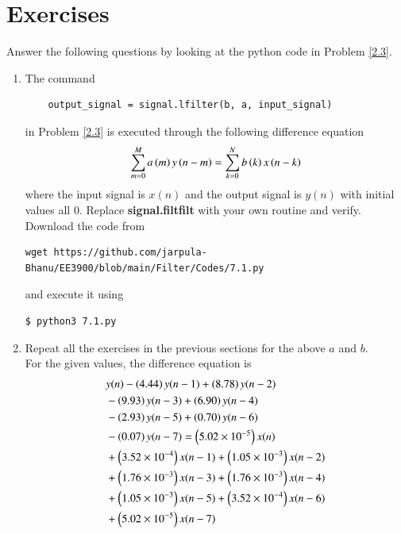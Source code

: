 \documentclass[journal,12pt,twocolumn]{IEEEtran}
\renewcommand\thesection{\arabic{section}}
\begin{document}
\section{Exercises}
Answer the following questions by looking at the python code in Problem \ref{2.3}.
\begin{enumerate}[label=\thesection.\arabic*]
\item
The command
\begin{lstlisting}
	output_signal = signal.lfilter(b, a, input_signal)
	\end{lstlisting}
in Problem \ref{2.3} is executed through the following difference equation
\begin{equation}
\label{eq:iir_filter_gen}
 \sum _{m=0}^{M}a\left(m\right)y\left(n-m\right)=\sum _{k=0}^{N}b\left(k\right)x\left(n-k\right)
\end{equation}
%
where the input signal is $x(n)$ and the output signal is $y(n)$ with initial values all 0. Replace
\textbf{signal.filtfilt} with your own routine and verify.\\
\solution Download the code from
\begin{lstlisting}
wget https://github.com/jarpula-Bhanu/EE3900/blob/main/Filter/Codes/7.1.py
\end{lstlisting}
and execute it using
\begin{lstlisting}
$ python3 7.1.py
\end{lstlisting}
%
\item Repeat all the exercises in the previous sections for the above $a$ and $b$.\\
\solution For the given values, the difference equation is
\begin{align}
	&y(n) - \left(4.44\right)y(n - 1) + \left(8.78\right)y(n - 2) \nonumber \\
	&- \left(9.93\right)y(n - 3) + \left(6.90\right)y(n - 4) \nonumber \\
	&- \left(2.93\right)y(n - 5) \nonumber + \left(0.70\right)y(n - 6) \nonumber \\
	&- \left(0.07\right)y(n - 7) = \left(5.02 \times 10^{-5}\right)x(n) \nonumber \\
	&+ \left(3.52 \times 10^{-4}\right)x(n - 1) + \left(1.05 \times 10^{-3}\right)x(n - 2) \nonumber \\
	&+ \left(1.76 \times 10^{-3}\right)x(n - 3) + \left(1.76 \times 10^{-3}\right)x(n - 4) \nonumber \\
	&+ \left(1.05 \times 10^{-3}\right)x(n - 5) + \left(3.52 \times 10^{-4}\right)x(n - 6) \nonumber \\
	&+ \left(5.02 \times 10^{-5}\right)x(n - 7)
\end{align}

\end{enumerate}
\end{document}
